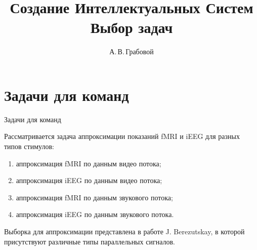 \documentclass[10pt,pdf,hyperref={unicode}]{beamer}
\title[Вводная лекция]{Создание Интеллектуальных Систем \\ Выбор задач}
\author{А.\,В.\,Грабовой}
\institute[]{Московский физико-технический институт}
\begin{document}
\begin{frame}
\titlepage
\end{frame}

\section{Задачи для команд}
\begin{frame}{Задачи для команд}
\bigskip

Рассматривается задача аппроксимации показаний fMRI и iEEG для разных типов стимулов:
\begin{enumerate}
    \item аппроксимация fMRI по данным видео потока;
    \item аппроксимация iEEG по данным видео потока;
    \item аппроксимация fMRI по данным звукового потока;
    \item аппроксимация iEEG по данным звукового потока.
\end{enumerate}

\bigskip

Выборка для аппроксимации представлена в работе J. Berezutskay\footnotemark, в которой присутствуют различные типы параллельных сигналов.

\bigskip
{}
\end{frame}
\end{document}
